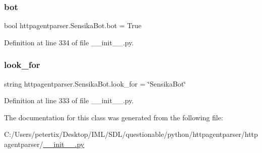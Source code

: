 \subsubsection{\texorpdfstring{bot}{bot}}
{\footnotesize\ttfamily bool httpagentparser.\+Sensika\+Bot.\+bot = True\hspace{0.3cm}{\ttfamily [static]}}



Definition at line 334 of file \+\_\+\+\_\+init\+\_\+\+\_\+.\+py.

\hypertarget{classhttpagentparser_1_1_sensika_bot_a1837d7bf009d223ccfe0ee64a288dca2}{}\label{classhttpagentparser_1_1_sensika_bot_a1837d7bf009d223ccfe0ee64a288dca2} 
\subsubsection{\texorpdfstring{look\+\_\+for}{look\_for}}
{\footnotesize\ttfamily string httpagentparser.\+Sensika\+Bot.\+look\+\_\+for = \char`\"{}Sensika\+Bot\char`\"{}\hspace{0.3cm}{\ttfamily [static]}}



Definition at line 333 of file \+\_\+\+\_\+init\+\_\+\+\_\+.\+py.



The documentation for this class was generated from the following file\+:\begin{DoxyCompactItemize}
\item 
C\+:/\+Users/petertix/\+Desktop/\+I\+M\+L/\+S\+D\+L/questionable/python/httpagentparser/httpagentparser/\hyperlink{____init_____8py}{\+\_\+\+\_\+init\+\_\+\+\_\+.\+py}\end{DoxyCompactItemize}
